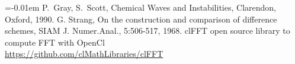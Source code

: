 \documentclass{sig-alternate-05-2015}
\begin{document}
%

\begin{thebibliography}{1}\itemsep=-0.01em
  \setlength{\baselineskip}{1.0em}
P.~Gray, S.~Scott, Chemical Waves and Instabilities, Clarendon, Oxford, 1990.
G. Strang, On the construction and comparison of difference schemes,
SIAM J. Numer.Anal., 5:506-517, 1968.
  clFFT open source library to compute FFT with OpenCl\\
  \url{https://github.com/clMathLibraries/clFFT}
  
\end{thebibliography}
%
%

\end{document}
